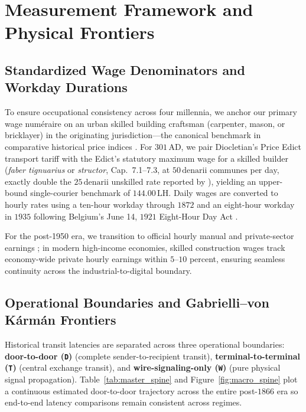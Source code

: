 \documentclass[11pt,a4paper]{article}
\begin{document}
\section{Measurement Framework and Physical Frontiers}
\label{sec:methodology}

\subsection{Standardized Wage Denominators and Workday Durations}
To ensure occupational consistency across four millennia, we anchor our primary wage num\'eraire on an urban skilled building craftsman (carpenter, mason, or bricklayer) in the originating jurisdiction---the canonical benchmark in comparative historical price indices \citep{PhelpsBrown1956,Allen2001,Malanima2007}. For $301\,\text{AD}$, we pair Diocletian's Price Edict transport tariff with the Edict's statutory maximum wage for a skilled builder (\textit{faber tignuarius} or \textit{structor}, Cap.\ 7.1--7.3, at $50\,\text{denarii communes}$ per day, exactly double the $25\,\text{denarii}$ unskilled rate reported by \citealt{Allen2007}), yielding an upper-bound single-courier benchmark of $144.00\,\text{LH}$. Daily wages are converted to hourly rates using a ten-hour workday through $1872$ \citep{Bowley1900,Scholliers1995} and an eight-hour workday in $1935$ following Belgium's June 14, $1921$ Eight-Hour Day Act \citep{Scholliers1995}.

For the post-1950 era, we transition to official hourly manual and private-sector earnings \citep{MinLabour1956,BLS2026,Eurostat2026}; in modern high-income economies, skilled construction wages track economy-wide private hourly earnings within $5$--$10$ percent, ensuring seamless continuity across the industrial-to-digital boundary.

\subsection{Operational Boundaries and Gabrielli--von K\'arm\'an Frontiers}
Historical transit latencies are separated across three operational boundaries: \textbf{door-to-door (\texttt{D})} (complete sender-to-recipient transit), \textbf{terminal-to-terminal (\texttt{T})} (central exchange transit), and \textbf{wire-signaling-only (\texttt{W})} (pure physical signal propagation). Table~\ref{tab:master_spine} and Figure~\ref{fig:macro_spine} plot a continuous estimated door-to-door trajectory across the entire post-$1866$ era so end-to-end latency comparisons remain consistent across regimes.
\end{document}
